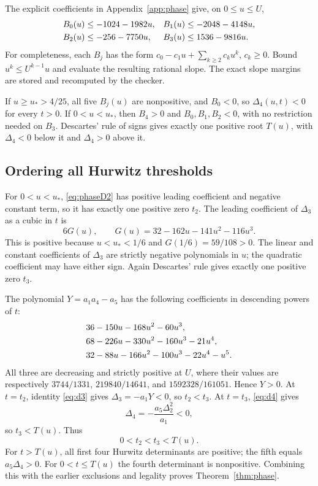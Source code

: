 \documentclass[11pt,a4paper]{article}
\theoremstyle{definition}\newtheorem{definition}[theorem]{Definition}
\theoremstyle{remark}\newtheorem{remark}[theorem]{Remark}
\begin{document}
The explicit coefficients in Appendix~\ref{app:phase} give, on $0\leq u\leq U$,
\begin{align}\label{eq:coefficientbounds}
 B_0(u)&\leq-1024-1982u,& B_1(u)&\leq-2048-4148u,\notag\\
 B_2(u)&\leq-256-7750u,& B_3(u)&\leq1536-9816u.
\end{align}
For completeness, each $B_j$ has the form $c_0-c_1u+\sum_{k\geq2}c_ku^k$, $c_k\geq0$. Bound $u^k\leq U^{k-1}u$ and evaluate the resulting rational slope. The exact slope margins are stored and recomputed by the checker.

If $u\geq u_*>4/25$, all five $B_j(u)$ are nonpositive, and $B_0<0$, so $\Delta_4(u,t)<0$ for every $t>0$. If $0<u<u_*$, then $B_4>0$ and $B_0,B_1,B_2<0$, with no restriction needed on $B_3$. Descartes' rule of signs gives exactly one positive root $T(u)$, with $\Delta_4<0$ below it and $\Delta_4>0$ above it.

\subsection{Ordering all Hurwitz thresholds}
For $0<u<u_*$, \eqref{eq:phaseD2} has positive leading coefficient and negative constant term, so it has exactly one positive zero $t_2$.
The leading coefficient of $\Delta_3$ as a cubic in $t$ is
\[
 6G(u),\qquad G(u)=32-162u-141u^2-116u^3.
\]
This is positive because $u<u_*<1/6$ and $G(1/6)=59/108>0$. The linear and constant coefficients of $\Delta_3$ are strictly negative polynomials in $u$; the quadratic coefficient may have either sign. Again Descartes' rule gives exactly one positive zero $t_3$.

The polynomial $Y=a_1a_4-a_5$ has the following coefficients in descending powers of $t$:
\begin{align}\label{eq:Ycoeffs}
 &36-150u-168u^2-60u^3,\notag\\
 &68-226u-330u^2-160u^3-21u^4,\notag\\
 &32-88u-166u^2-100u^3-22u^4-u^5.
\end{align}
All three are decreasing and strictly positive at $U$, where their values are respectively
$3744/1331$, $219840/14641$, and $1592328/161051$. Hence $Y>0$.
At $t=t_2$, identity \eqref{eq:d3} gives $\Delta_3=-a_1Y<0$, so $t_2<t_3$. At $t=t_3$, \eqref{eq:d4} gives
\[
 \Delta_4=-\frac{a_5\Delta_2^2}{a_1}<0,
\]
so $t_3<T(u)$. Thus
\[
 0<t_2<t_3<T(u).
\]
For $t>T(u)$, all first four Hurwitz determinants are positive; the fifth equals $a_5\Delta_4>0$. For $0<t\leq T(u)$ the fourth determinant is nonpositive. Combining this with the earlier exclusions and legality proves Theorem~\ref{thm:phase}.
\end{document}
